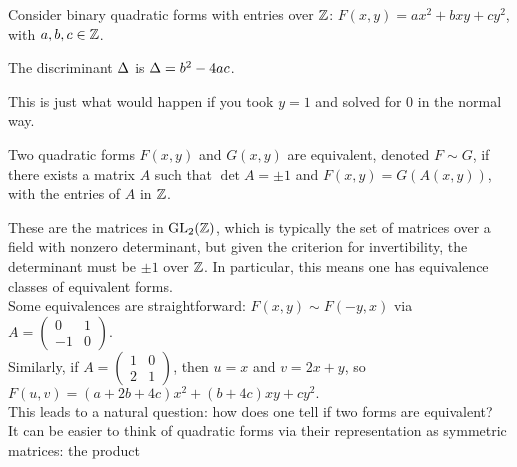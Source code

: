 %
Consider binary quadratic forms with entries over $\mathbb{Z}$: $F(x,y) = ax^2+bxy+cy^2$, with $a,b,c\in\mathbb{Z}$.
\begin{defn} The discriminant $\Delta$ is $\Delta = b^2-4ac$.\end{defn}
This is just what would happen if you took $y = 1$ and solved for $0$ in the normal way.
\begin{defn} Two quadratic forms $F(x,y)$ and $G(x,y)$ are equivalent, denoted $F\sim G$, if there exists a matrix $A$ such that $\det A = \pm 1$ and $F(x,y) = G(A(x,y))$, with the entries of $A$ in $\mathbb{Z}$.\end{defn}
These are the matrices in $\operatorname{GL}_{2}(\mathbb{Z})$, which is typically the set of matrices over a field with nonzero determinant, but given the criterion for invertibility, the determinant must be $\pm 1$ over $\mathbb{Z}$. In particular, this means one has equivalence classes of equivalent forms.\\
Some equivalences are straightforward: $F(x,y) \sim F(-y,x)$ via $A = \begin{pmatrix}0&1\\-1&0\end{pmatrix}$.\\%
Similarly, if $A = \begin{pmatrix}1&0\\2&1\end{pmatrix}$, then $u=x$ and $v = 2x+y$, so
$F(u,v) = (a+2b+4c)x^2+(b+4c)xy+cy^2.$\\
This leads to a natural question: how does one tell if two forms are equivalent?\\
It can be easier to think of quadratic forms via their representation as symmetric matrices: the product
